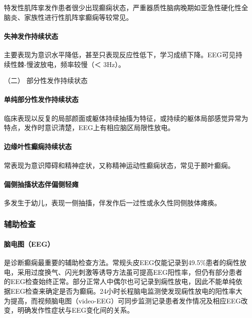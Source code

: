 特发性肌阵挛发作患者很少出现癫痫状态，严重器质性脑病晚期如亚急性硬化性全脑炎、家族性进行性肌阵挛癫痫等较常见。

\paragraph{失神发作持续状态}

主要表现为意识水平降低，甚至只表现反应性低下，学习成绩下降。EEG可见持续性棘-慢波放电，频率较慢（＜
3Hz）。

\hypertarget{text00245.htmlux5cux23CHP8-2-2-3-2}{}
（二） 部分性发作持续状态

\paragraph{单纯部分性发作持续状态}

临床表现以反复的局部颜面或躯体持续抽搐为特征，或持续的躯体局部感觉异常为特点，发作时意识清楚，EEG上有相应脑区局限性放电。

\paragraph{边缘叶性癫痫持续状态}

常表现为意识障碍和精神症状，又称精神运动性癫痫状态，常见于颞叶癫痫。

\paragraph{偏侧抽搐状态伴偏侧轻瘫}

多发生于幼儿，表现一侧抽搐，伴发作后一过性或永久性同侧肢体瘫痪。

\subsubsection{辅助检查}

\paragraph{脑电图（EEG）}

是诊断癫痫最重要的辅助检查方法。常规头皮EEG仅能记录到49.5\%患者的痫性放电，采用过度换气、闪光刺激等诱导方法虽可提高EEG阳性率，但仍有部分患者的EEG检查始终正常。部分正常人中偶尔也可记录到痫性放电，因此不能单纯依据EEG检查来确定是否为癫痫。24小时长程脑电监测使发现痫性放电的阳性率大为提高，而视频脑电图（video-EEG）可同步监测记录患者发作情况及相应EEG改变，明确发作性症状与EEG变化间的关系。

